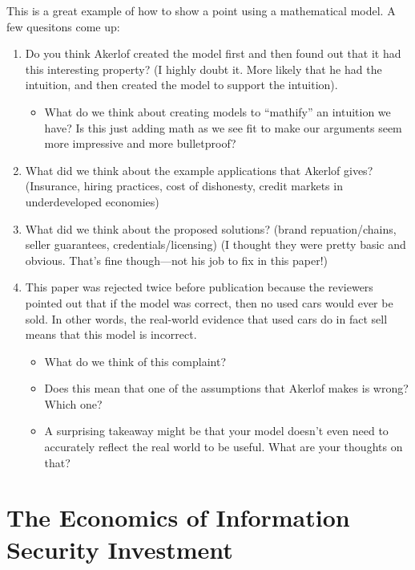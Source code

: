 \documentclass[11pt]{article}
\begin{document}
This is a great example of how to show a point using a mathematical model. A few quesitons come up:
\begin{enumerate}
    \item Do you think Akerlof created the model first and then found out that it had this interesting property? (I highly doubt it. More likely that he had the intuition, and then created the model to support the intuition).
    \begin{itemize}
        \item What do we think about creating models to ``mathify'' an intuition we have? Is this just adding math as we see fit to make our arguments seem more impressive and more bulletproof? 
    \end{itemize}
    \item What did we think about the example applications that Akerlof gives? (Insurance, hiring practices, cost of dishonesty, credit markets in underdeveloped economies)
    \item What did we think about the proposed solutions? (brand repuation/chains, seller guarantees, credentials/licensing) (I thought they were pretty basic and obvious. That's fine though---not his job to fix in this paper!)
    \item This paper was rejected twice before publication because the reviewers pointed out that if the model was correct, then no used cars would ever be sold. In other words, the real-world evidence that used cars do in fact sell means that this model is incorrect.
    \begin{itemize}
        \item What do we think of this complaint?
        \item Does this mean that one of the assumptions that Akerlof makes is wrong? Which one?
        \item A surprising takeaway might be that your model doesn't even need to accurately reflect the real world to be useful. What are your thoughts on that?
    \end{itemize}
\end{enumerate}

\section{The Economics of Information Security Investment}
\end{document}
